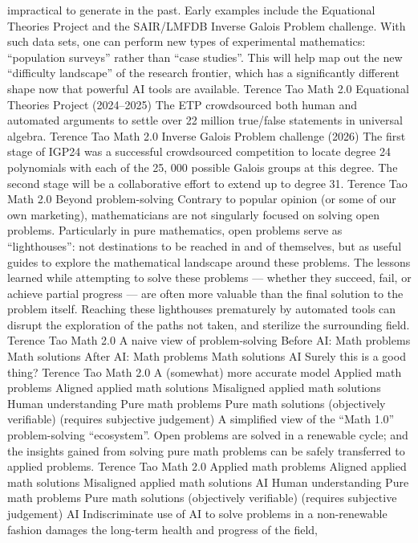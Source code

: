 impractical to generate in the past.
Early examples include the Equational Theories Project
and the SAIR/LMFDB Inverse Galois Problem challenge.
With such data sets, one can perform new types of
experimental mathematics: “population surveys” rather
than “case studies”.
This will help map out the new “difficulty landscape” of the
research frontier, which has a significantly different shape
now that powerful AI tools are available.
Terence Tao
Math 2.0
Equational Theories Project (2024–2025)
The ETP crowdsourced both human and automated arguments
to settle over 22 million true/false statements in universal
algebra.
Terence Tao
Math 2.0
Inverse Galois Problem challenge (2026)
The first stage of IGP24 was a successful crowdsourced
competition to locate degree 24 polynomials with each of the
25, 000 possible Galois groups at this degree. The second
stage will be a collaborative effort to extend up to degree 31.
Terence Tao
Math 2.0
Beyond problem-solving
Contrary to popular opinion (or some of our own
marketing), mathematicians are not singularly focused on
solving open problems.
Particularly in pure mathematics, open problems serve as
“lighthouses”: not destinations to be reached in and of
themselves, but as useful guides to explore the
mathematical landscape around these problems.
The lessons learned while attempting to solve these
problems — whether they succeed, fail, or achieve partial
progress — are often more valuable than the final solution
to the problem itself.
Reaching these lighthouses prematurely by automated
tools can disrupt the exploration of the paths not taken,
and sterilize the surrounding field.
Terence Tao
Math 2.0
A naive view of problem-solving
Before AI:
Math
problems
Math
solutions
After AI:
Math
problems
Math
solutions
AI
Surely this is a good thing?
Terence Tao
Math 2.0
A (somewhat) more accurate model
Applied math
problems
Aligned applied
math solutions
Misaligned applied
math solutions
Human
understanding
Pure math
problems
Pure math
solutions
(objectively verifiable)
(requires subjective
judgement)
A simplified view of the “Math 1.0” problem-solving
“ecosystem”. Open problems are solved in a renewable cycle;
and the insights gained from solving pure math problems can
be safely transferred to applied problems.
Terence Tao
Math 2.0
Applied math
problems
Aligned applied
math solutions
Misaligned applied
math solutions
AI
Human
understanding
Pure math
problems
Pure math
solutions
(objectively verifiable)
(requires subjective
judgement)
AI
Indiscriminate use of AI to solve problems in a non-renewable
fashion damages the long-term health and progress of the field,
